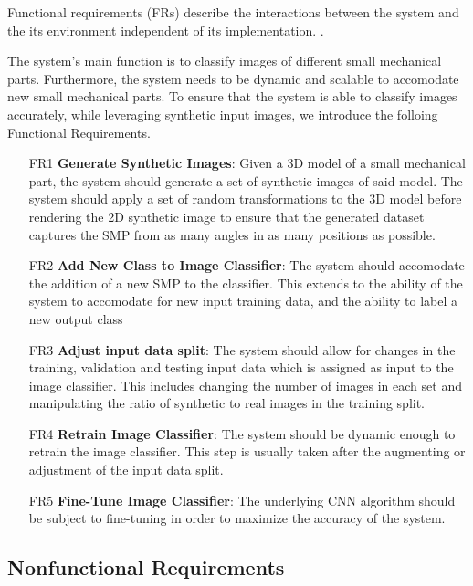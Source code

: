 \documentclass[a4paper,12pt,twoside]{report}
\begin{document}
Functional requirements (FRs) describe the interactions between the system and the its environment independent of its implementation. \cite{bruegge2004object}.

The system's main function is to classify images of different small mechanical parts. Furthermore, the system needs to be dynamic and scalable to accomodate new small mechanical parts. To ensure that the system is able to classify images accurately, while leveraging synthetic input images, we introduce the folloing Functional Requirements.

\begin{itemize}
  \item [FR1] \textbf{Generate Synthetic Images}: Given a 3D model of a small mechanical part, the system should generate a set of synthetic images of said model. The system should apply a set of random transformations to the 3D model before rendering the 2D synthetic image to ensure that the generated dataset captures the SMP from as many angles in as many positions as possible.

  \item [FR2] \textbf{Add New Class to Image Classifier}: The system should accomodate the addition of a new SMP to the classifier. This extends to the ability of the system to accomodate for new input training data, and the ability to label a new output class

  \item [FR3] \textbf{Adjust input data split}: The system should allow for changes in the training, validation and testing input data which is assigned as input to the image classifier. This includes changing the number of images in each set and manipulating the ratio of synthetic to real images in the training split.

  \item [FR4] \textbf{Retrain Image Classifier}: The system should be dynamic enough to retrain the image classifier. This step is usually taken after the augmenting or adjustment of the input data split.

  \item [FR5] \textbf{Fine-Tune Image Classifier}: The underlying CNN algorithm should be subject to fine-tuning in order to maximize the accuracy of the system.
\end{itemize}

\subsection{Nonfunctional Requirements}
\end{document}
